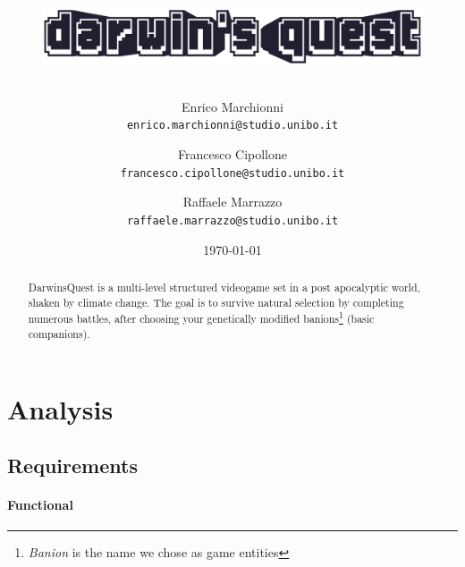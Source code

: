 \documentclass[12pt, a4paper]{report}
\title{
    \begin{figure}[ht]
    \centering{}
    \includegraphics[width=\textwidth]{logo} %
    \end{figure}
}
\author{
    Enrico Marchionni\\
    \texttt{enrico.marchionni@studio.unibo.it}
    \and
    Francesco Cipollone\\
    \texttt{francesco.cipollone@studio.unibo.it}
    \and
    Raffaele Marrazzo\\
    \texttt{raffaele.marrazzo@studio.unibo.it}
}
\date{\today}
\begin{document}
\maketitle

\begin{abstract}

    DarwinsQuest \cite{ontheoriginofspiecies} is a multi-level structured videogame set in a post apocalyptic world,
    shaken by climate change. The goal is to survive natural selection by completing numerous battles,
    after choosing your genetically modified banions\footnote{\emph{Banion} is the name we chose as game entities} (basic companions).

\end{abstract}

\tableofcontents

\chapter{Analysis}

\section{Requirements}

\subsubsection{Functional}
\end{document}
